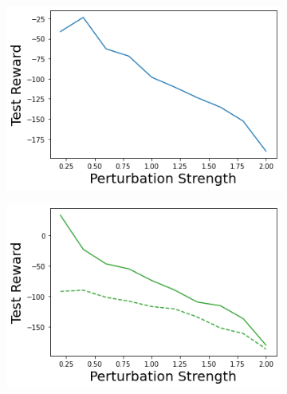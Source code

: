 \begin{figure}
\begin{subfigure}{.245\textwidth}
    \end{subfigure}
    \begin{subfigure}{.245\textwidth}
        \includegraphics[width=\textwidth]{sections/011_icml2022/resources/action_shift-DKL-LunarLanderShift-v0-mean_reward_.png}
    \end{subfigure}
    \begin{subfigure}{.245\textwidth}
        \includegraphics[width=\textwidth]{sections/011_icml2022/resources/action_shift-PostNet-LunarLanderShift-v0-mean_reward_.png}
    \end{subfigure}
    

\end{figure}
